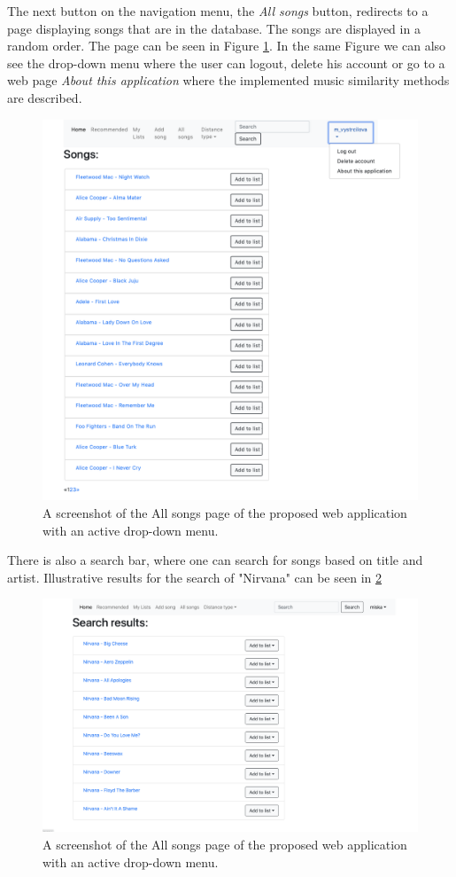 The next button on the navigation menu, the \textit{All songs} button, redirects to a page displaying songs that are in the database. The songs are displayed in a random order. The page can be seen in Figure \ref{fig:all_songs_page}. In the same Figure we can also see the drop-down menu where the user can logout, delete his account or go to a web page \textit{About this application} where the implemented music similarity methods are described.
\begin{figure}[H]
    \centering
	\includegraphics[width=1\linewidth]{./img/all_songs_page.png}
	\caption{A screenshot of the All songs page of the proposed web application with an active drop-down menu.}
	\label{fig:all_songs_page}
\end{figure}
There is also a search bar, where one can search for songs based on title and artist. Illustrative results for the search of "Nirvana" can be seen in \ref{fig:search_results} \\
\begin{figure}[H]
    \centering
	\includegraphics[width=1\linewidth]{./img/search_results_page.png}
	\caption{A screenshot of the All songs page of the proposed web application with an active drop-down menu.}
	\label{fig:search_results}
\end{figure}
